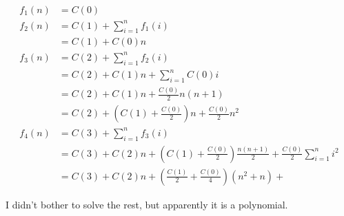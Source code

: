 \documentclass{article}
\def\Par#1{ { \left( {#1} \right)} }
\begin{document}
\begin{align*}
  f_1(n) &= C(0) \\
  f_2(n) &= C(1) + \sum_{i=1}^n f_1(i) \\
    &= C(1) + C(0) n \\
  f_3(n) &= C(2) + \sum_{i=1}^n f_2(i) \\
    &= C(2) + C(1) n + \sum_{i=1}^n C(0) i \\
    &= C(2) + C(1) n + \frac{C(0)}2 n(n+1) \\
    &= C(2) + \Par{C(1) + \frac{C(0)}2} n + \frac{C(0)}2 n^2 \\
  f_4(n) &= C(3) + \sum_{i=1}^n f_3(i) \\
    &= C(3) + C(2) n + \Par{C(1) + \frac{C(0)}2} \frac{n(n+1)}2 + \frac{C(0)}2 \sum_{i=1}^n i^2 \\
    &= C(3) + C(2) n + \Par{\frac{C(1)}2 + \frac{C(0)}4} \Par{n^2+n} + 
\end{align*}

I didn't bother to solve the rest, but apparently it is a polynomial.
\end{document}
